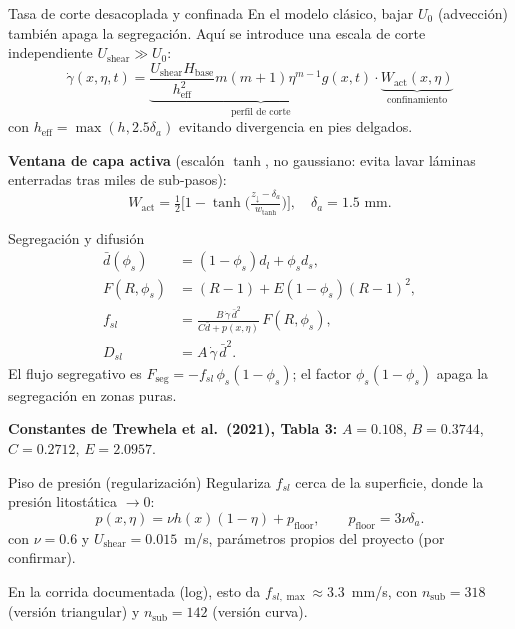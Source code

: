 \documentclass[11pt]{beamer}
\begin{document}
\begin{frame}{Tasa de corte desacoplada y confinada}
En el modelo clásico, bajar $U_0$ (advección) también apaga la segregación. Aquí se introduce una escala de corte independiente $U_{\mathrm{shear}}\gg U_0$:
\begin{equation}
    \dot\gamma(x,\eta,t) =
    \underbrace{\frac{U_{\mathrm{shear}}H_{\mathrm{base}}}{h_{\mathrm{eff}}^2}m(m+1)\eta^{m-1}g(x,t)}_{\text{perfil de corte}}
    \cdot \underbrace{W_{\mathrm{act}}(x,\eta)}_{\text{confinamiento}}
\end{equation}
con $h_{\mathrm{eff}}=\max(h,2.5\delta_a)$ evitando divergencia en pies delgados.

\vspace{4pt}
\textbf{Ventana de capa activa} (escalón $\tanh$, no gaussiano: evita lavar láminas enterradas tras miles de sub-pasos):
\begin{equation}
    W_{\mathrm{act}} = \tfrac12\Big[1-\tanh\Big(\tfrac{z_\downarrow-\delta_a}{w_{\tanh}}\Big)\Big], \quad \delta_a=1.5\text{ mm}.
\end{equation}
\end{frame}

\begin{frame}{Segregación y difusión}
\begin{align}
    \bar d(\phi_s) &= (1-\phi_s)d_l+\phi_s d_s, \\[2pt]
    F(R,\phi_s) &= (R-1)+E(1-\phi_s)(R-1)^2, \\[2pt]
    f_{sl} &= \frac{B\,\dot\gamma\,\bar d^2}{C\bar d+p(x,\eta)}\,F(R,\phi_s), \\[2pt]
    D_{sl} &= A\,\dot\gamma\,\bar d^2 .
\end{align}
El flujo segregativo es $F_{\mathrm{seg}}=-f_{sl}\,\phi_s(1-\phi_s)$; el factor $\phi_s(1-\phi_s)$ apaga la segregación en zonas puras.

\vspace{4pt}
{\small\textbf{Constantes de Trewhela et al.\ (2021), Tabla 3:} $A=0.108$, $B=0.3744$, $C=0.2712$, $E=2.0957$.\par}
\end{frame}

\begin{frame}{Piso de presión (regularización)}
Regulariza $f_{sl}$ cerca de la superficie, donde la presión litostática $\to 0$:
\begin{equation}
    p(x,\eta) = \nu h(x)(1-\eta) + p_{\mathrm{floor}}, \qquad p_{\mathrm{floor}}=3\nu\delta_a .
\end{equation}
con $\nu=0.6$ y $U_{\mathrm{shear}}=0.015$~m/s, parámetros propios del proyecto (por confirmar). 

\vspace{6pt}
En la corrida documentada (log), esto da $f_{sl,\max}\approx3.3$~mm/s, con $n_{\mathrm{sub}}=318$ (versión triangular) y $n_{\mathrm{sub}}=142$ (versión curva).
\end{frame}
\end{document}
